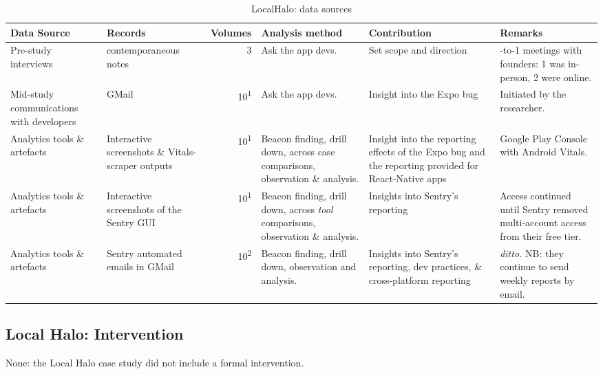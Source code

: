 \begin{table}
    \centering
    \footnotesize
    \tabcolsep=0.12cm
    \begin{tabular}{p{2.4cm}p{2.4cm}r>{\raggedright}p{2.4cm}>{\raggedright}p{3cm}>{\raggedright\arraybackslash}p{2.5cm}} %
        Data Source & Records & Volumes & Analysis method & Contribution & Remarks \\
        \toprule
         Pre-study interviews & contemporaneous notes\footnotemark & 3 & Ask the app devs. & Set scope and direction & 1-to-1 meetings with founders: 1 was in-person, 2 were online. \\
         Mid-study communications with developers & GMail & 10\textsuperscript{1} & Ask the app devs. & Insight into the Expo bug & Initiated by the researcher. \\
         Analytics tools \& artefacts &Interactive screenshots \& Vitals-scraper outputs &10\textsuperscript{1} & Beacon finding, drill down, across case comparisons, observation \& analysis. & Insight into the reporting effects of the Expo bug and the reporting provided for React-Native apps & Google Play Console with Android Vitals. \\
         Analytics tools \& artefacts & Interactive screenshots of the Sentry GUI & 10\textsuperscript{1} & Beacon finding, drill down, across \textit{tool} comparisons\footnotemark, observation \& analysis. & Insights into Sentry's reporting & Access continued until Sentry removed multi-account access from their free tier. \\
         Analytics tools \& artefacts & Sentry automated emails in GMail & 10\textsuperscript{2} & Beacon finding, drill down, observation and analysis. & Insights into Sentry's reporting, dev practices, \& cross-platform reporting & \textit{ditto.} NB: they continue to send weekly reports by email. \\
         \bottomrule
    \end{tabular}
    \caption{LocalHalo: data sources}
    \label{tab:localhalo-data-sources}
\end{table}


\subsection{Local Halo: Intervention}
None: the Local Halo case study did not include a formal intervention.

